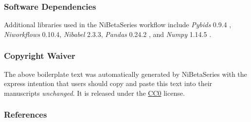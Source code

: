 \documentclass[
]{article}
\begin{document}
\hypertarget{software-dependencies}{%
\subsubsection{Software Dependencies}\label{software-dependencies}}

Additional libraries used in the NiBetaSeries workflow include
\emph{Pybids} 0.9.4 \citep{Yarkoni2019}, \emph{Niworkflows} 0.10.4,
\emph{Nibabel} 2.3.3, \emph{Pandas} 0.24.2 \citep{McKinney2010}, and
\emph{Numpy} 1.14.5 \citep{VanDerWalt2011, Oliphant2006}.

\hypertarget{copyright-waiver}{%
\subsubsection{Copyright Waiver}\label{copyright-waiver}}

The above boilerplate text was automatically generated by NiBetaSeries
with the express intention that users should copy and paste this text
into their manuscripts \emph{unchanged}. It is released under the
\href{https://creativecommons.org/publicdomain/zero/1.0/}{CC0} license.

\hypertarget{references}{%
\subsubsection{References}\label{references}}

  
\end{document}
